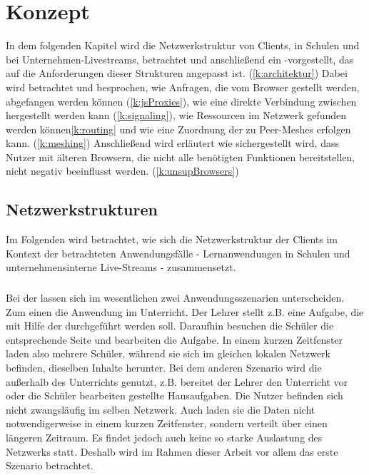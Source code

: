 \chapter{Konzept}\label{ch:concept}
%
In dem folgenden Kapitel wird die Netzwerkstruktur von Clients, in Schulen und bei Unternehmen-Livestreams, betrachtet und anschließend ein \pTp-\cdn vorgestellt, das auf die Anforderungen dieser Strukturen angepasst ist. (\ref{k:architektur}) Dabei wird betrachtet und besprochen, wie Anfragen, die vom Browser gestellt werden, abgefangen werden können (\ref{k:jsProxies}), wie eine direkte Verbindung zwischen \clients hergestellt werden kann (\ref{k:signaling}), wie Ressourcen im Netzwerk gefunden werden können\ref{k:routing} und wie eine Zuordnung der \clients zu Peer-Meshes erfolgen kann. (\ref{k:meshing}) Anschließend wird erläutert wie sichergestellt wird, dass Nutzer mit älteren Browsern, die nicht alle benötigten Funktionen bereitstellen, nicht negativ beeinflusst werden. (\ref{k:unsupBrowsers})


\section{Netzwerkstrukturen}
Im Folgenden wird betrachtet, wie sich die Netzwerkstruktur der Clients im Kontext der betrachteten Anwendungsfälle - Lernanwendungen in Schulen und unternehmensinterne Live-Streams - zusammensetzt.
\subsection{\schulCloud}
Bei der \schulCloud lassen sich im wesentlichen zwei Anwendungsszenarien unterscheiden. Zum einen die Anwendung im Unterricht. Der Lehrer stellt z.B. eine Aufgabe, die mit Hilfe der \schulCloud durchgeführt werden soll. Daraufhin besuchen die Schüler die entsprechende Seite und bearbeiten die Aufgabe. In einem kurzen Zeitfenster laden also mehrere Schüler, während sie sich im gleichen lokalen Netzwerk befinden, dieselben Inhalte herunter. Bei dem anderen Szenario wird die \schulCloud außerhalb des Unterrichts genutzt, z.B. bereitet der Lehrer den Unterricht vor oder die Schüler bearbeiten gestellte Hausaufgaben. Die Nutzer befinden sich nicht zwangsläufig im selben Netzwerk. Auch laden sie die Daten nicht notwendigerweise in einem kurzen Zeitfenster, sondern verteilt über einen längeren Zeitraum. Es findet jedoch auch keine so starke Auslastung des Netzwerks statt. Deshalb wird im Rahmen dieser Arbeit vor allem das erste Szenario betrachtet.

